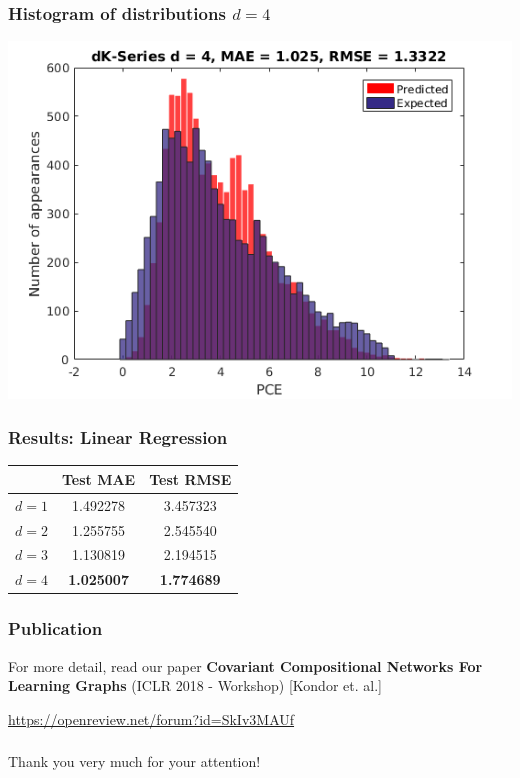 \documentclass{beamer}
\begin{document}
\begin{frame}
\frametitle{Histogram of distributions $d = 4$}
\begin{justify}
\begin{center}
	\includegraphics[scale=0.5]{d4}
\end{center}
\end{justify}
\end{frame}

\begin{frame}
\frametitle{Results: Linear Regression}
\begin{justify}
\begin{center}
\begin{tabular}{|| c | c | c ||} 
\hline
& Test MAE & Test RMSE \\
\hline
$d = 1$ & 1.492278 & 3.457323 \\
\hline
$d = 2$ & 1.255755 & 2.545540 \\
\hline
$d = 3$ & 1.130819 & 2.194515 \\
\hline 
$d = 4$ & \textbf{1.025007} & \textbf{1.774689} \\
\hline
\end{tabular}
\end{center}


\end{justify}
\end{frame}

\begin{frame}
\frametitle{Publication}
For more detail, read our paper \textbf{Covariant Compositional Networks For Learning Graphs} (ICLR 2018 - Workshop) [Kondor et. al.] \\
\begin{center}
\url{https://openreview.net/forum?id=SkIv3MAUf}
\end{center}
\end{frame}

\begin{frame}
\frametitle{}
\begin{center}
Thank you very much for your attention!
\end{center}
\end{frame}
\end{document}
